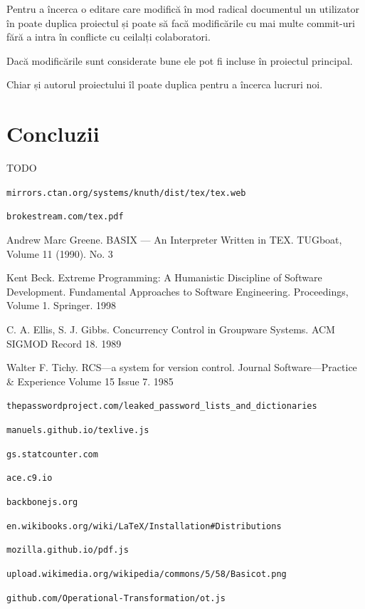 \documentclass[a4wide,12pt]{report}
\newcommand{\eng}[1]{{#1}} %
\newcommand{\url}[1]{\texttt{#1}}
\newcommand{\idee}[1]{{\color{red} #1}}
\newcommand{\capfara}[1]{
    \chapter*{#1}
    \addcontentsline{toc}{chapter}{#1}
}
\begin{document}
Pentru a încerca o editare care modifică în mod radical documentul un utilizator
în poate duplica proiectul și poate să facă modificările cu mai multe
\eng{commit}-uri fără a intra în conflicte cu ceilalți colaboratori.

Dacă modificările sunt considerate bune ele pot fi incluse în proiectul
principal.

Chiar și autorul proiectului îl poate duplica pentru a încerca lucruri noi.

\capfara{Concluzii}

\idee{TODO}

\begin{thebibliography}{1}

\url{mirrors.ctan.org/systems/knuth/dist/tex/tex.web}

\url{brokestream.com/tex.pdf}

Andrew Marc Greene. BASIX --- An Interpreter Written in TEX. TUGboat, Volume 11 (1990). No. 3

Kent Beck. Extreme Programming: A Humanistic Discipline of Software Development.
Fundamental Approaches to Software Engineering. Proceedings, Volume 1. Springer. 1998

C. A. Ellis, S. J. Gibbs. Concurrency Control in Groupware Systems. ACM SIGMOD Record 18. 1989

Walter F. Tichy. RCS—a system for version control. Journal
Software—Practice \& Experience Volume 15 Issue 7. 1985

\url{thepasswordproject.com/leaked\_password\_lists\_and\_dictionaries}

\url{manuels.github.io/texlive.js}

\url{gs.statcounter.com}

\url{ace.c9.io}

\url{backbonejs.org}

\url{en.wikibooks.org/wiki/LaTeX/Installation\#Distributions}

\url{mozilla.github.io/pdf.js}

\url{upload.wikimedia.org/wikipedia/commons/5/58/Basicot.png}

\url{github.com/Operational-Transformation/ot.js}

\end{thebibliography}
\end{document}
